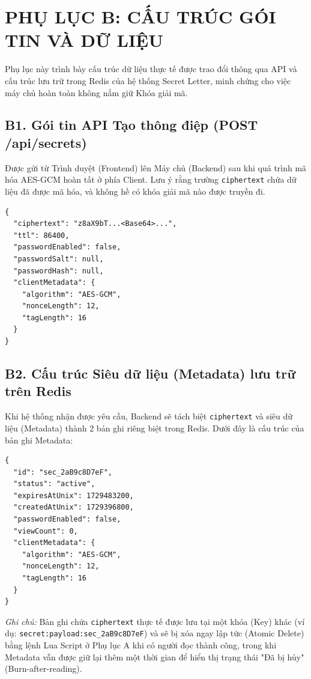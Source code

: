 \chapter*{PHỤ LỤC B: CẤU TRÚC GÓI TIN VÀ DỮ LIỆU}
\setcounter{section}{0}
\renewcommand{\thesection}{B\arabic{section}}

Phụ lục này trình bày cấu trúc dữ liệu thực tế được trao đổi thông qua API và cấu trúc lưu trữ trong Redis của hệ thống Secret Letter, minh chứng cho việc máy chủ hoàn toàn không nắm giữ Khóa giải mã.

\section*{B1. Gói tin API Tạo thông điệp (POST /api/secrets)}

Được gửi từ Trình duyệt (Frontend) lên Máy chủ (Backend) sau khi quá trình mã hóa AES-GCM hoàn tất ở phía Client. Lưu ý rằng trường \texttt{ciphertext} chứa dữ liệu đã được mã hóa, và không hề có khóa giải mã nào được truyền đi.

\begin{verbatim}
{
  "ciphertext": "z8aX9bT...<Base64>...",
  "ttl": 86400,
  "passwordEnabled": false,
  "passwordSalt": null,
  "passwordHash": null,
  "clientMetadata": {
    "algorithm": "AES-GCM",
    "nonceLength": 12,
    "tagLength": 16
  }
}
\end{verbatim}

\section*{B2. Cấu trúc Siêu dữ liệu (Metadata) lưu trữ trên Redis}

Khi hệ thống nhận được yêu cầu, Backend sẽ tách biệt \texttt{ciphertext} và siêu dữ liệu (Metadata) thành 2 bản ghi riêng biệt trong Redis. Dưới đây là cấu trúc của bản ghi Metadata:

\begin{verbatim}
{
  "id": "sec_2aB9c8D7eF",
  "status": "active",
  "expiresAtUnix": 1729483200,
  "createdAtUnix": 1729396800,
  "passwordEnabled": false,
  "viewCount": 0,
  "clientMetadata": {
    "algorithm": "AES-GCM",
    "nonceLength": 12,
    "tagLength": 16
  }
}
\end{verbatim}

\textit{Ghi chú:} Bản ghi chứa \texttt{ciphertext} thực tế được lưu tại một khóa (Key) khác (ví dụ: \texttt{secret:payload:sec\_2aB9c8D7eF}) và sẽ bị xóa ngay lập tức (Atomic Delete) bằng lệnh Lua Script ở Phụ lục A khi có người đọc thành công, trong khi Metadata vẫn được giữ lại thêm một thời gian để hiển thị trạng thái "Đã bị hủy" (Burn-after-reading).